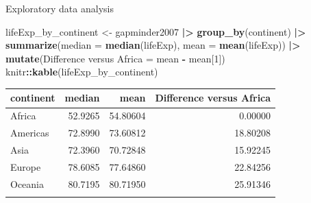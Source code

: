 \documentclass[
  ignorenonframetext,
]{beamer}
\newenvironment{Shaded}{\begin{snugshade}}{\end{snugshade}}
\newcommand{\AttributeTok}[1]{\textcolor[rgb]{0.13,0.29,0.53}{#1}}
\newcommand{\DecValTok}[1]{\textcolor[rgb]{0.00,0.00,0.81}{#1}}
\newcommand{\FunctionTok}[1]{\textcolor[rgb]{0.13,0.29,0.53}{\textbf{#1}}}
\newcommand{\NormalTok}[1]{#1}
\newcommand{\OtherTok}[1]{\textcolor[rgb]{0.56,0.35,0.01}{#1}}
\newcommand{\SpecialCharTok}[1]{\textcolor[rgb]{0.81,0.36,0.00}{\textbf{#1}}}
\newcommand{\StringTok}[1]{\textcolor[rgb]{0.31,0.60,0.02}{#1}}
\begin{document}
\begin{frame}[fragile]{Exploratory data analysis}
\protect\hypertarget{exploratory-data-analysis-7}{}
\normalsize

\begin{Shaded}
\begin{Highlighting}[]
\NormalTok{lifeExp\_by\_continent }\OtherTok{\textless{}{-}}\NormalTok{ gapminder2007 }\SpecialCharTok{|\textgreater{}}
  \FunctionTok{group\_by}\NormalTok{(continent) }\SpecialCharTok{|\textgreater{}}
  \FunctionTok{summarize}\NormalTok{(}\AttributeTok{median =} \FunctionTok{median}\NormalTok{(lifeExp), }
            \AttributeTok{mean =} \FunctionTok{mean}\NormalTok{(lifeExp)) }\SpecialCharTok{|\textgreater{}} 
  \FunctionTok{mutate}\NormalTok{(}\StringTok{\textasciigrave{}}\AttributeTok{Difference versus Africa}\StringTok{\textasciigrave{}} \OtherTok{=}\NormalTok{ mean }\SpecialCharTok{{-}}\NormalTok{ mean[}\DecValTok{1}\NormalTok{])}
\NormalTok{knitr}\SpecialCharTok{::}\FunctionTok{kable}\NormalTok{(lifeExp\_by\_continent)}
\end{Highlighting}
\end{Shaded}

\begin{longtable}[]{@{}lrrr@{}}
\toprule\noalign{}
continent & median & mean & Difference versus Africa \\
\midrule\noalign{}
\endhead
Africa & 52.9265 & 54.80604 & 0.00000 \\
Americas & 72.8990 & 73.60812 & 18.80208 \\
Asia & 72.3960 & 70.72848 & 15.92245 \\
Europe & 78.6085 & 77.64860 & 22.84256 \\
Oceania & 80.7195 & 80.71950 & 25.91346 \\
\bottomrule\noalign{}
\end{longtable}

\normalsize
\end{frame}
\end{document}
